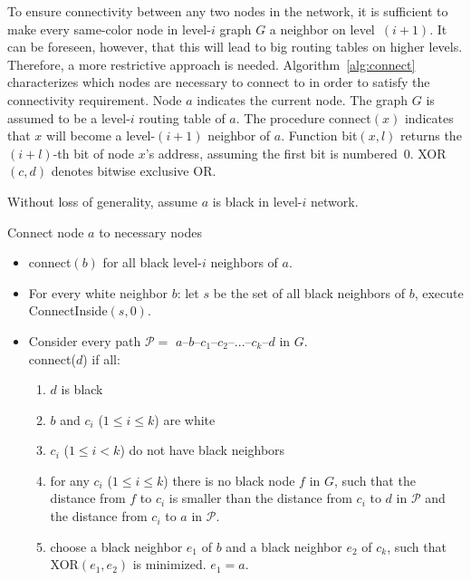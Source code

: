 \documentclass[conference]{IEEEtran}
\theoremstyle{definition}
\newcommand{\cP}{{\mathcal{P}}}
\newcommand{\cN}{{\mathcal{N}}}
\begin{document}
To ensure connectivity between any two nodes in the network, it is sufficient to make every same-color node in level-$i$ graph $G$ a neighbor on level~$(i+1)$. It can be foreseen, however, that this will lead to big routing tables on higher levels. Therefore, a more restrictive approach is needed. Algorithm~\ref{alg:connect} characterizes which nodes are necessary to connect to in order to satisfy the connectivity requirement. Node $a$ indicates the current node. The graph $G$ is assumed to be a level-$i$ routing table of $a$.
The procedure  connect$(x)$ indicates that $x$ will become a level-$(i+1)$ neighbor of $a$. Function bit$(x, l)$ returns the $(i + l)$-th bit of node $x$'s address, assuming the first bit is numbered~0. XOR$(c, d)$ denotes bitwise exclusive OR.

Without loss of generality, assume $a$ is black in level-$i$ network.



\begin{algorithm}[H]
    \caption{Connect node $a$ to necessary nodes}
    \label{alg:connect}

    \begin{itemize} 
        \item   connect$(b)$ for all black level-$i$ neighbors of $a$.

        \item   For every white neighbor $b$: let $s$ be the set of all black neighbors of $b$, execute ConnectInside$(s, 0)$.

        \item   Consider every path $\cP = $ $a$--$b$--$c_1$--$c_2$--...--$c_k$--$d$ in $G$.  \\
        connect($d$) if all:
        \begin{enumerate}
            \item   $d$ is black
            \item   $b$ and $c_i$ ($1 \le i \le k$) are white
            \item   $c_i$ ($1 \le i < k$) do not have black neighbors
            \item   for any $c_i$ ($1 \le i \le k$) there is no black node $f$ in $G$, such that the distance
                    from $f$ to $c_i$ is smaller than the distance
                    from $c_i$ to $d$ in $\cP$ and the distance from $c_i$ to $a$ in $\cP$.
            \item   choose a black neighbor $e_1$ of $b$ and a black neighbor $e_2$ of $c_k$,
                    such that XOR$(e_1, e_2)$ is minimized. $e_1 = a$.
        \end{enumerate}
    \end{itemize} 
\end{algorithm}
\end{document}

